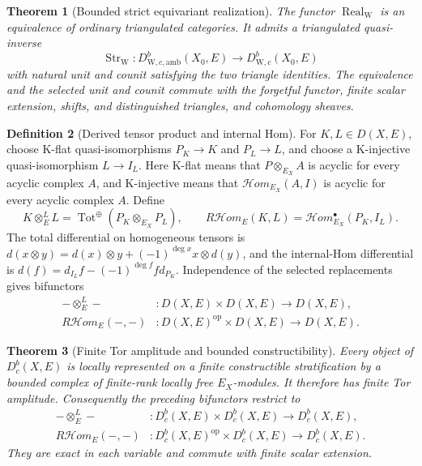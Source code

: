 \documentclass[10pt]{article}
\newtheorem{theorem}{Theorem}[section]
\theoremstyle{definition}
\newtheorem{definition}[theorem]{Definition}
\newcommand{\Dbc}{D^b_c}
\newcommand{\WeilD}{D^b_{\mathrm W,c}}
\newcommand{\RHom}{R\mathcal Hom}
\begin{document}
\begin{theorem}[Bounded strict equivariant realization]
The functor \(\operatorname{Real}_{\mathrm W}\) is an equivalence of
ordinary triangulated categories.  It admits a triangulated quasi-inverse
\[
 \operatorname{Str}_{\mathrm W}:
 D^b_{\mathrm W,c,\mathrm{amb}}(X_0,E)\longrightarrow\WeilD(X_0,E)
\]
with natural unit and counit satisfying the two triangle identities.  The
equivalence and the selected unit and counit commute with the forgetful
functor, finite scalar extension, shifts, and distinguished
triangles, and cohomology sheaves.
\end{theorem}

\begin{definition}[Derived tensor product and internal Hom]
For \(K,L\in D(X,E)\), choose K-flat quasi-isomorphisms \(P_K\to K\) and
\(P_L\to L\), and choose a K-injective quasi-isomorphism \(L\to I_L\).
Here K-flat means that \(P\otimes_{E_X}A\) is acyclic for every acyclic
complex \(A\), and K-injective means that
\(\mathcal Hom_{E_X}(A,I)\) is acyclic for every acyclic complex \(A\).
Define
\[
 K\otimes_E^LL=\operatorname{Tot}^{\oplus}(P_K\otimes_{E_X}P_L),
 \qquad
 \RHom_E(K,L)=\mathcal Hom^\bullet_{E_X}(P_K,I_L).
\]
The total differential on homogeneous tensors is
\(d(x\otimes y)=d(x)\otimes y+(-1)^{\deg x}x\otimes d(y)\), and the
internal-Hom differential is
\(d(f)=d_{I_L}f-(-1)^{\deg f}f d_{P_K}\).  Independence of the selected
replacements gives bifunctors
\[
 \begin{aligned}
 -\otimes_E^L- &:D(X,E)\times D(X,E)\longrightarrow D(X,E),\\
 \RHom_E(-,-) &:D(X,E)^{\mathrm{op}}\times D(X,E)
                                      \longrightarrow D(X,E).
 \end{aligned}
\]
\end{definition}

\begin{theorem}[Finite Tor amplitude and bounded constructibility]
Every object of \(\Dbc(X,E)\) is locally represented on a finite
constructible stratification by a bounded complex of finite-rank locally
free \(E_X\)-modules.  It therefore has finite Tor amplitude.  Consequently
the preceding bifunctors restrict to
\[
 \begin{aligned}
 -\otimes_E^L- &: \Dbc(X,E)\times\Dbc(X,E)\longrightarrow\Dbc(X,E),\\
 \RHom_E(-,-) &: \Dbc(X,E)^{\mathrm{op}}\times\Dbc(X,E)
                                      \longrightarrow\Dbc(X,E).
 \end{aligned}
\]
They are exact in each variable and commute with finite scalar extension.
\end{theorem}
\end{document}
